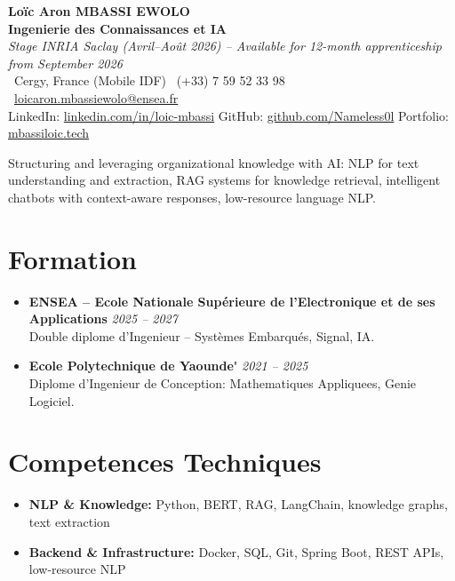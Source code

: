 \documentclass[a4paper,11pt]{article}
\begin{document}
\begin{center}
    {\Large \textbf{Lo\"ic Aron MBASSI EWOLO}} \\ \vspace{4pt}
    \textbf{\large Ingenierie des Connaissances et IA} \\
    \textit{\small Stage INRIA Saclay (Avril--Ao\^ut 2026) -- Available for 12-month apprenticeship from September 2026} \\ \vspace{4pt}
    \small
    \Pointinghand\ Cergy, France (Mobile IDF) \quad
    \Mobilefone\ (+33) 7 59 52 33 98 \quad
    {\color{primary}\Letter\ \href{mailto:loicaron.mbassiewolo@ensea.fr}{loicaron.mbassiewolo@ensea.fr}} \\ \vspace{2pt}
    {\color{primary}LinkedIn: \href{https://www.linkedin.com/in/loic-mbassi/}{linkedin.com/in/loic-mbassi}} \quad
    {\color{primary}GitHub: \href{https://github.com/Nameless0l}{github.com/Nameless0l}} \quad
    {\color{primary}Portfolio: \href{https://mbassiloic.tech}{mbassiloic.tech}}
\end{center}

\vspace{-6pt}

\noindent\small{Structuring and leveraging organizational knowledge with AI: NLP for text understanding and extraction, RAG systems for knowledge retrieval, intelligent chatbots with context-aware responses, low-resource language NLP.}

\section{Formation}
\begin{itemize}[leftmargin=*, label=\tiny$\bullet$, nosep]
    \item \textbf{ENSEA -- Ecole Nationale Sup\'erieure de l'Electronique et de ses Applications} \hfill \textit{2025 -- 2027} \\
    \small{Double diplome d'Ingenieur -- Syst\`emes Embarqu\'es, Signal, IA.}
    \item \textbf{Ecole Polytechnique de Yaounde\'} \hfill \textit{2021 -- 2025} \\
    \small{Diplome d'Ingenieur de Conception: Mathematiques Appliquees, Genie Logiciel.}
\end{itemize}

\section{Competences Techniques}
\begin{itemize}[leftmargin=*, nosep]
    \item \small{\textbf{NLP \& Knowledge:} Python, BERT, RAG, LangChain, knowledge graphs, text extraction}
    \item \small{\textbf{Backend \& Infrastructure:} Docker, SQL, Git, Spring Boot, REST APIs, low-resource NLP}
\end{itemize}
\end{document}
